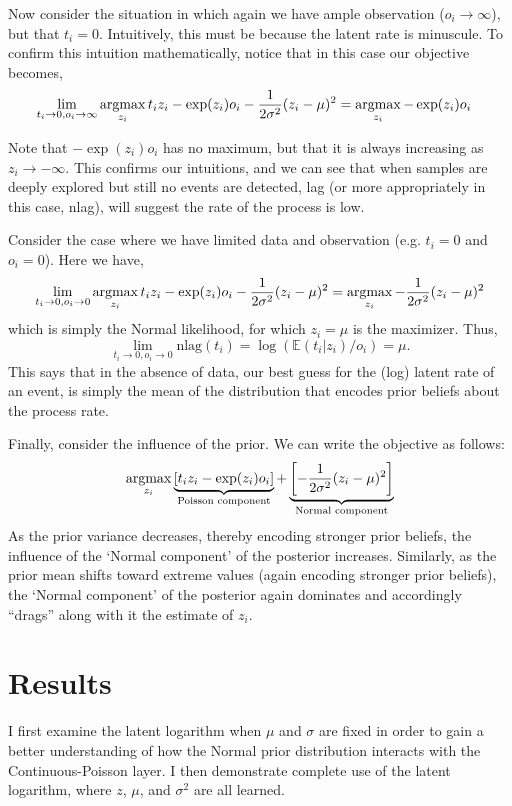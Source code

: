 \documentclass[11pt]{article}
\newcommand{\argmax}{\operatornamewithlimits{argmax}}
\begin{document}
Now consider the situation in which again we have ample observation ($o_i \rightarrow \infty$), but that $t_i = 0$. Intuitively, this must be because the latent rate is minuscule. To confirm this intuition mathematically, notice that in this case our objective becomes, 
\begin{align*}
&  \lim_{t_i \to 0, o_i \to \infty} \argmax_{z_i} t_i z_i - \exp(z_i)o_i -\frac{1}{2\sigma^2}(z_i - \mu)^2 = \argmax_{z_i} - \exp(z_i)o_i
\end{align*}

Note that $- \exp(z_i)o_i$ has no maximum, but that it is always increasing as $z_i \rightarrow -\infty$. This confirms our intuitions, and we can see that when samples are deeply explored but still no events are detected, lag (or more appropriately in this case, nlag), will suggest the rate of the process is low.

Consider the case where we have limited data and observation (e.g. $t_i = 0$ and $o_i = 0$). Here we have, 
\[
\lim_{t_i \to 0, o_i \to 0} \argmax_{z_i} t_i z_i - \exp(z_i)o_i -\frac{1}{2\sigma^2}(z_i - \mu)^2 = \argmax_{z_i} -\frac{1}{2\sigma^2}(z_i - \mu)^2
\]
which is simply the Normal likelihood, for which $z_i = \mu$ is the maximizer. Thus,
\[
\lim_{t_i \to 0,o_i \to 0}\textrm{nlag}(t_i) = \log(\mathbb{E}(t_i|z_i)/o_i) = \mu.   
\]
This says that in the absence of data, our best guess for the (log) latent rate of an event, is simply the mean of the distribution that encodes prior beliefs about the process rate.

Finally, consider the influence of the prior. We can write the objective as follows:
\[
\argmax_{z_i} \underbrace{[t_i z_i - \exp(z_i)o_i]}_{\textrm{Poisson component}} + \underbrace{\left[-\frac{1}{2\sigma^2}(z_i - \mu)^2\right]}_{\textrm{Normal component}}
\]
As the prior variance decreases, thereby encoding stronger prior beliefs, the influence of the `Normal component' of the posterior increases. Similarly, as the prior mean shifts toward extreme values (again encoding stronger prior beliefs), the `Normal component' of the posterior again dominates and accordingly ``drags'' along with it the estimate of $z_i$.  

\section{Results}

I first examine the latent logarithm when $\mu$ and $\sigma$ are fixed in order to gain a better understanding of how the Normal prior distribution interacts with the Continuous-Poisson layer. I then demonstrate complete use of the latent logarithm, where $z$, $\mu$, and $\sigma^2$ are all learned. 
\end{document}
